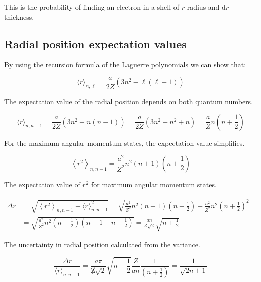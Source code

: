 \documentclass[italian]{HKNdocument}
\begin{document}
This is the probability of finding an electron in a shell of $r$ radius and $\mathrm{d} r$ thickness.

\subsection{Radial position expectation values}
By using the recursion formula of the Laguerre polynomials we can show that:

\begin{equation}
\langle r\rangle_{n, \ell}=\frac{a}{2 Z}\left(3 n^{2}-\ell(\ell+1)\right) \label{eq:9.100}
\end{equation}

The expectation value of the radial position depends on both quantum numbers.

\begin{equation}
\langle r\rangle_{n, n-1}=\frac{a}{2 Z}\left(3 n^{2}-n(n-1)\right)=\frac{a}{2 Z}\left(3 n^{2}-n^{2}+n\right)=\frac{a}{Z} n\left(n+\frac{1}{2}\right) \label{eq:9.101}
\end{equation}

For the maximum angular momentum states, the expectation value simplifies.

\begin{equation}
\left\langle r^{2}\right\rangle_{n, n-1}=\frac{a^{2}}{Z^{2}} n^{2}(n+1)\left(n+\frac{1}{2}\right) \label{eq:9.102}
\end{equation}

The expectation value of $r^2$ for maximum angular momentum states.

\begin{align}
\Delta r & =\sqrt{\left\langle r^{2}\right\rangle_{n, n-1}-\langle r\rangle_{n, n-1}^{2}}=\sqrt{\frac{a^{2}}{Z^{2}} n^{2}(n+1)\left(n+\frac{1}{2}\right)-\frac{a^{2}}{Z^{2}} n^{2}\left(n+\frac{1}{2}\right)^{2}}= \\
& =\sqrt{\frac{a^{2}}{Z^{2}} n^{2}\left(n+\frac{1}{2}\right)\left(n+1-n-\frac{1}{2}\right)}=\frac{a n}{Z \sqrt{2}} \sqrt{n+\frac{1}{2}} \label{eq:9.103}
\end{align}

The uncertainty in radial position calculated from the variance.

\begin{equation}
\frac{\Delta r}{\langle r\rangle_{n, n-1}}=\frac{a \pi}{\not Z \sqrt{2}} \sqrt{n+\frac{1}{2}} \frac{Z}{a n} \frac{1}{\left(n+\frac{1}{2}\right)}=\frac{1}{\sqrt{2 n+1}} \label{eq:9.104}
\end{equation}
\end{document}
